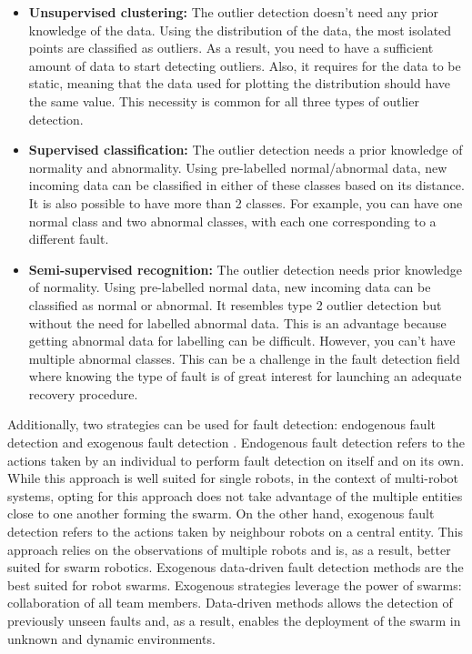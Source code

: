 \begin{itemize}
    \item \textbf{Unsupervised clustering:} The outlier detection doesn’t need any prior knowledge of the data. Using the distribution of the data, the most isolated points are classified as outliers. As a result, you need to have a sufficient amount of data to start detecting outliers. Also, it requires for the data to be static, meaning that the data used for plotting the distribution should have the same value. This necessity is common for all three types of outlier detection.
    \item \textbf{Supervised classification:} The outlier detection needs a prior knowledge of normality and abnormality. Using pre-labelled normal/abnormal data, new incoming data can be classified in either of these classes based on its distance. It is also possible to have more than 2 classes. For example, you can have one normal class and two abnormal classes, with each one corresponding to a different fault. 
    \item \textbf{Semi-supervised recognition:} The outlier detection needs prior knowledge of normality. Using pre-labelled normal data, new incoming data can be classified as normal or abnormal. It resembles type 2 outlier detection but without the need for labelled abnormal data. This is an advantage because getting abnormal data for labelling can be difficult. However, you can’t have multiple abnormal classes. This can be a challenge in the fault detection field where knowing the type of fault is of great interest for launching an adequate recovery procedure.
\end{itemize}


Additionally, two strategies can be used for fault detection: endogenous fault detection and exogenous fault detection \cite{christensen2008fault, lau2012error, Miller2021modern}. Endogenous fault detection refers to the actions taken by an individual to perform fault detection on itself and on its own. While this approach is well suited for single robots, in the context of multi-robot systems, opting for this approach does not take advantage of the multiple entities close to one another forming the swarm. On the other hand, exogenous fault detection refers to the actions taken by neighbour robots on a central entity. This approach relies on the observations of multiple robots and is, as a result, better suited for swarm robotics. Exogenous data-driven fault detection methods are the best suited for robot swarms. Exogenous strategies leverage the power of swarms: collaboration of all team members. Data-driven methods allows the detection of previously unseen faults and, as a result, enables the deployment of the swarm in unknown and dynamic environments.


